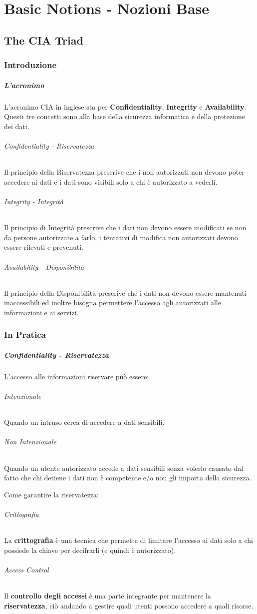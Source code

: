 \chapter{Basic Notions - Nozioni Base}
\thispagestyle{chapterInit}
\section{The CIA Triad}
    \subsection{Introduzione}
    \paragraph{L'acronimo} L'acronimo CIA in inglese sta per \textbf{Confidentiality}, \textbf{Integrity} e \textbf{Availability}. Questi tre concetti sono alla base della sicurezza informatica e della protezione dei dati.  
        \subparagraph{Confidentiality - Riservatezza}
        \label{subPar:confidentiality}
            Il principio della Riservatezza prescrive che i non autorizzati non devono poter accedere ai dati e i dati sono visibili solo a chi è autorizzato a vederli.
        \subparagraph{Integrity - Integrità}
        \label{subPar:integrity}
            Il principio di Integrità prescrive che i dati non devono essere modificati se non da persone autorizzate a farlo, i tentativi di modifica non autorizzati devono essere rilevati e prevenuti.
        \subparagraph{Availability - Disponibilità}
            Il principio della Disponibilità prescrive che i dati non devono essere mantenuti inaccessibili ed inoltre bisogna permettere l'accesso agli autorizzati alle informazioni e ai servizi.
    \subsection{In Pratica}
        \paragraph{Confidentiality - Riservatezza}
            L'accesso alle informazioni riservare può essere:
            \subparagraph{Intenzionale} Quando un intruso cerca di accedere a dati sensibili.
            \subparagraph{Non Intenzionale} Quando un utente autorizzato accede a dati sensibili senza volerlo causato dal fatto che chi detiene i dati non è competente e/o non gli importa della sicurezza.
        
            Come garantire la riservatezza:
            \subparagraph{Crittografia} La \textbf{crittografia} è una tecnica che permette di limitare l'accesso ai dati solo a chi possiede la chiave per decifrarli (e quindi è autorizzato).
            \subparagraph{Access Control} Il \textbf{controllo degli accessi} è una parte integrante per mantenere la \textbf{riservatezza}, ciò andando a gestire quali utenti possono accedere a quali risorse.

